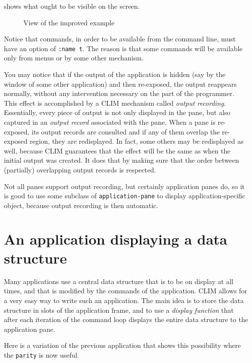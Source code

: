  shows what ought to be visible on the screen.

\begin{figure}
  \begin{center}
  \end{center}
  \caption{\label{fig-ex2} View of the improved example}
\end{figure}

Notice that commands, in order to be available from the command line,
must have an option of \texttt{:name t}.  The reason is that some
commands will be available only from menus or by some other mechanism.

You may notice that if the output of the application is hidden (say by
the window of some other application) and then re-exposed, the output
reappears normally, without any intervention necessary on the part of
the programmer.  This effect is accomplished by a CLIM mechanism
called \emph{output recording}.  Essentially, every piece of output is
not only displayed in the pane, but also captured in an \emph{output
  record} associated with the pane.  When a pane is re-exposed, its
output records are consulted and if any of them overlap the re-exposed
region, they are redisplayed.  In fact, some others may be redisplayed
as well, because CLIM guarantees that the effect will be the same as
when the initial output was created.  It does that by making sure that
the order between (partially) overlapping output records is respected.

Not all panes support output recording, but certainly application
panes do, so it is good to use some subclass of
\texttt{application-pane} to display application-specific object,
because output recording is then automatic.

\section{An application displaying a data structure}

Many applications use a central data structure that is to be on
display at all times, and that is modified by the commands of the
application.  CLIM allows for a very easy way to write such an
application.  The main idea is to store the data structure in slots of
the application frame, and to use a \emph{display function} that after
each iteration of the command loop displays the entire data structure
to the application pane.

Here is a variation of the previous application that shows this
possibility where the \texttt{parity} is now useful. 

